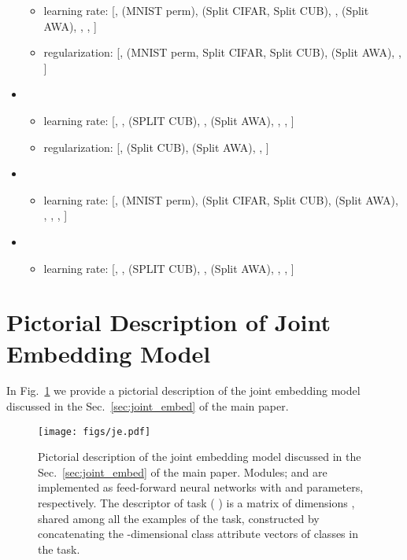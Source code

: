 \begin{itemize}
                \begin{itemize}
                        \item learning rate: [,  (MNIST perm),  (Split CIFAR, Split CUB), ,  (Split AWA), , , ]
                        \item regularization: [,  (MNIST perm, Split CIFAR, Split CUB),  (Split AWA), , ]
                \end{itemize}
        \item {\rwalkz}
                \begin{itemize}
                        \item learning rate: [, ,  (SPLIT CUB), ,  (Split AWA), , , ]
                                       \item regularization: [,  (Split CUB),  (Split AWA), , ]
                \end{itemize}
        \item {\sgem}
                \begin{itemize}
                        \item learning rate: [,  (MNIST perm),  (Split CIFAR, Split CUB),  (Split AWA), , , , ]
                \end{itemize}
        \item {\sgemz}
                \begin{itemize}
                        \item learning rate: [, ,  (SPLIT CUB), ,  (Split AWA), , , ]
                \end{itemize}
\end{itemize}

\section{Pictorial Description of Joint Embedding Model }
In Fig.~\ref{fig:je_pict_desc} we provide a pictorial description of the joint embedding model discussed in the Sec.~\ref{sec:joint_embed} of the main paper. 
\label{sec:je_pict_desc}
\begin{figure}[t]
    \centering
    \texttt{[image: figs/je.pdf]}
    \caption{Pictorial description of the joint embedding model discussed in the Sec.~\ref{sec:joint_embed} of the main paper. Modules;  and  are implemented as feed-forward neural networks with  and  parameters, respectively. The descriptor of task  ( ) is a matrix of dimensions , shared among all the examples of the task, constructed by concatenating the -dimensional class attribute vectors of  classes in the task.}
    \label{fig:je_pict_desc}
\end{figure}